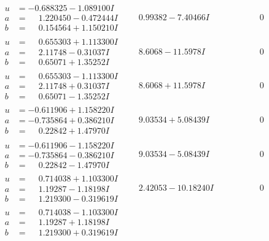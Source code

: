 \documentclass[1p]{elsarticle_modified}
\theoremstyle{definition}
\begin{document}
$$\begin{array}{c|c|c}
\begin{aligned}
u &= -0.688325 - 1.089100 I \\
a &= \phantom{-}1.220450 - 0.472444 I \\
b &= \phantom{-}0.154564 + 1.150210 I\end{aligned}
 & \phantom{-}0.99382 - 7.40466 I & \phantom{-0.000000 } 0 \\ \hline\begin{aligned}
u &= \phantom{-}0.655303 + 1.113300 I \\
a &= \phantom{-}2.11748 - 0.31037 I \\
b &= \phantom{-}0.65071 + 1.35252 I\end{aligned}
 & \phantom{-}8.6068 - 11.5978 I & \phantom{-0.000000 } 0 \\ \hline\begin{aligned}
u &= \phantom{-}0.655303 - 1.113300 I \\
a &= \phantom{-}2.11748 + 0.31037 I \\
b &= \phantom{-}0.65071 - 1.35252 I\end{aligned}
 & \phantom{-}8.6068 + 11.5978 I & \phantom{-0.000000 } 0 \\ \hline\begin{aligned}
u &= -0.611906 + 1.158220 I \\
a &= -0.735864 + 0.386210 I \\
b &= \phantom{-}0.22842 + 1.47970 I\end{aligned}
 & \phantom{-}9.03534 + 5.08439 I & \phantom{-0.000000 } 0 \\ \hline\begin{aligned}
u &= -0.611906 - 1.158220 I \\
a &= -0.735864 - 0.386210 I \\
b &= \phantom{-}0.22842 - 1.47970 I\end{aligned}
 & \phantom{-}9.03534 - 5.08439 I & \phantom{-0.000000 } 0 \\ \hline\begin{aligned}
u &= \phantom{-}0.714038 + 1.103300 I \\
a &= \phantom{-}1.19287 - 1.18198 I \\
b &= \phantom{-}1.219300 - 0.319619 I\end{aligned}
 & \phantom{-}2.42053 - 10.18240 I & \phantom{-0.000000 } 0 \\ \hline\begin{aligned}
u &= \phantom{-}0.714038 - 1.103300 I \\
a &= \phantom{-}1.19287 + 1.18198 I \\
b &= \phantom{-}1.219300 + 0.319619 I\end{aligned}

\end{array}$$
\end{document}
